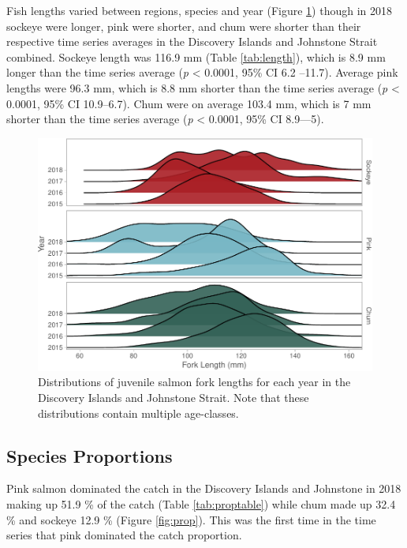 \documentclass[fleqn,10pt]{wlpeerj} %
\begin{document}
Fish lengths varied between regions, species and year (Figure
\ref{fig:lengthplot}) though in 2018 sockeye were longer, pink were
shorter, and chum were shorter than their respective time series
averages in the Discovery Islands and Johnstone Strait combined. Sockeye
length was 116.9 mm (Table \ref{tab:length}), which is 8.9 mm longer
than the time series average (\emph{p} \textless{} 0.0001, 95\% CI 6.2
--11.7). Average pink lengths were 96.3 mm, which is 8.8 mm shorter than
the time series average (\emph{p} \textless{} 0.0001, 95\% CI
10.9--6.7). Chum were on average 103.4 mm, which is 7 mm shorter than
the time series average (\emph{p} \textless{} 0.0001, 95\% CI 8.9---5).

\begin{figure}[H]
\includegraphics[width=0.9\linewidth]{peer_j_migration_dynamics_files/figure-latex/lengthplot-1} \caption{Distributions of juvenile salmon fork lengths for each year in the Discovery Islands and Johnstone Strait. Note that these distributions contain multiple age-classes.}\label{fig:lengthplot}
\end{figure}

\subsection*{Species Proportions}\label{species-proportions}

Pink salmon dominated the catch in the Discovery Islands and Johnstone
in 2018 making up 51.9 \% of the catch (Table \ref{tab:proptable}) while
chum made up 32.4 \% and sockeye 12.9 \% (Figure \ref{fig:prop}). This
was the first time in the time series that pink dominated the catch
proportion.
\end{document}
